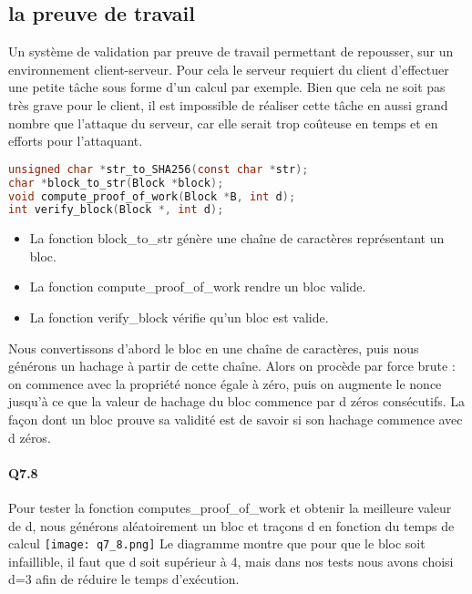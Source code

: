 \documentclass{article}
\begin{document}
\subsection{la preuve de travail}
Un système de validation par preuve de travail permettant de repousser, sur un environnement client-serveur.\newline
Pour cela le serveur requiert du client d'effectuer une petite tâche sous forme d'un calcul par exemple. \newline
Bien que cela ne soit pas très grave pour le client, il est impossible de réaliser cette tâche en aussi grand nombre que l'attaque du serveur, car elle serait trop coûteuse en temps et en efforts pour l'attaquant.
\begin{lstlisting}[language={C}]
unsigned char *str_to_SHA256(const char *str);
char *block_to_str(Block *block);
void compute_proof_of_work(Block *B, int d);
int verify_block(Block *, int d);
\end{lstlisting}
\begin{itemize}
\item La fonction block\_to\_str génère une chaîne de caractères
représentant un bloc.
\item La fonction compute\_proof\_of\_work  rendre un bloc valide.
\item La fonction verify\_block vérifie qu’un bloc est valide.
\end{itemize}
Nous convertissons d'abord le bloc en une chaîne de caractères, puis nous générons un hachage à partir de cette chaîne.\newline
Alors on procède par force brute : on commence avec la propriété nonce égale à zéro, puis on augmente le nonce jusqu'à ce que la valeur de hachage du bloc commence par d zéros consécutifs.\newline
La façon dont un bloc prouve sa validité est de savoir si son hachage commence avec d zéros.
\paragraph*{Q7.8}
Pour tester la fonction computes\_proof\_of\_work et obtenir la meilleure valeur de d, nous générons aléatoirement un bloc et traçons d en fonction du temps de calcul\newline
\texttt{[image: q7\_8.png]}\newline
Le diagramme montre que pour que le bloc soit infaillible, il faut que d soit supérieur à 4, mais dans nos tests nous avons choisi d=3 afin de réduire le temps d'exécution.
\end{document}
